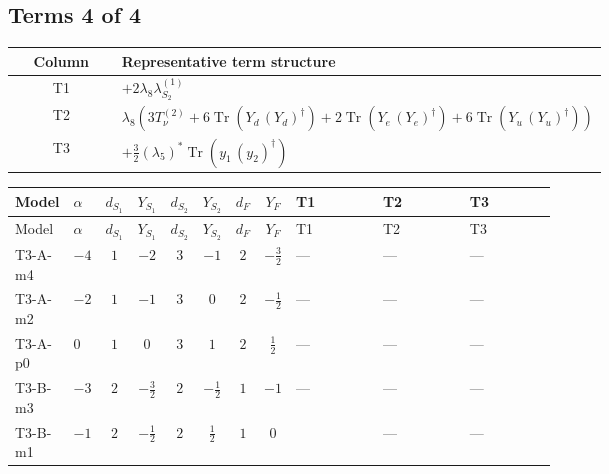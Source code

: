 \documentclass[8pt]{article}
\begin{document}
\begin{landscape}
\subsection*{Terms 4 of 4}
\begin{center}
\begin{tabular}{@{}c >{\raggedright\arraybackslash}p{0.82\linewidth}@{}}
\toprule
Column & Representative term structure \\
\midrule
T1 & \(\displaystyle +2 {\lambda_{8}} {\lambda_{S_2}^{(1)}}\) \\
\midrule
T2 & \(\displaystyle {\lambda_{8}} (3 T_{\nu}^{(2)}+6 \operatorname{Tr}\!\left({Y_d}\,\left({Y_d}\right)^{\dagger}\right)+2 \operatorname{Tr}\!\left({Y_e}\,\left({Y_e}\right)^{\dagger}\right)+6 \operatorname{Tr}\!\left({Y_u}\,\left({Y_u}\right)^{\dagger}\right))\) \\
\midrule
T3 & \(\displaystyle +\frac{3}{2} \left({\lambda_5}\right)^{*} \operatorname{Tr}\!\left({y_1}\,\left({y_2}\right)^{\dagger}\right)\) \\
\midrule
\bottomrule
\end{tabular}
\end{center}
\smallskip
\tiny
\begin{longtable}{@{}llcccccc >{\raggedright\arraybackslash}p{0.21\linewidth} >{\raggedright\arraybackslash}p{0.21\linewidth} >{\raggedright\arraybackslash}p{0.21\linewidth}@{}}
\toprule
Model & $\alpha$ & $d_{S_1}$ & $Y_{S_1}$ & $d_{S_2}$ & $Y_{S_2}$ & $d_F$ & $Y_F$ & T1 & T2 & T3 \\
\midrule
\endfirsthead
\toprule
Model & $\alpha$ & $d_{S_1}$ & $Y_{S_1}$ & $d_{S_2}$ & $Y_{S_2}$ & $d_F$ & $Y_F$ & T1 & T2 & T3 \\
\midrule
\endhead
T3-A-m4 & $-4$ & $1$ & $-2$ & $3$ & $-1$ & $2$ & $-\frac{3}{2}$ & --- & --- & --- \\
\midrule
T3-A-m2 & $-2$ & $1$ & $-1$ & $3$ & $0$ & $2$ & $-\frac{1}{2}$ & --- & --- & --- \\
\midrule
T3-A-p0 & $0$ & $1$ & $0$ & $3$ & $1$ & $2$ & $\frac{1}{2}$ & --- & --- & --- \\
\midrule
T3-B-m3 & $-3$ & $2$ & $-\frac{3}{2}$ & $2$ & $-\frac{1}{2}$ & $1$ & $-1$ & --- & --- & --- \\
\midrule
T3-B-m1 & $-1$ & $2$ & $-\frac{1}{2}$ & $2$ & $\frac{1}{2}$ & $1$ & $0$ & \scriptsize\adjustbox{max width=\linewidth}{$\begin{gathered} +2 {\lambda_{8}} {\lambda_{S_2}^{(1)}}\end{gathered}$} & --- & --- \\

\end{longtable}
\end{landscape}
\end{document}
